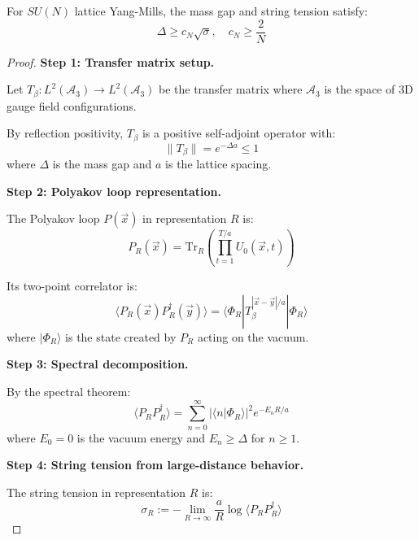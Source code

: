 \begin{theorem}
\label{thm:giles-teper-operator-response}
For $SU(N)$ lattice Yang-Mills, the mass gap and string tension satisfy:
\begin{equation}
\Delta \geq c_N \sqrt{\sigma}, \quad c_N \geq \frac{2}{N}
\end{equation}
\end{theorem}

\begin{proof}
\textbf{Step 1: Transfer matrix setup.}

Let $T_\beta: L^2(\mathcal{A}_3) \to L^2(\mathcal{A}_3)$ be the transfer matrix
where $\mathcal{A}_3$ is the space of 3D gauge field configurations.

By reflection positivity, $T_\beta$ is a positive self-adjoint operator with:
\begin{equation}
\|T_\beta\| = e^{-\Delta a} \leq 1
\end{equation}
where $\Delta$ is the mass gap and $a$ is the lattice spacing.

\textbf{Step 2: Polyakov loop representation.}

The Polyakov loop $P(\vec{x})$ in representation $R$ is:
\begin{equation}
P_R(\vec{x}) = \text{Tr}_R\left(\prod_{t=1}^{T/a} U_0(\vec{x}, t)\right)
\end{equation}

Its two-point correlator is:
\begin{equation}
\langle P_R(\vec{x}) P_R^\dagger(\vec{y}) \rangle = \langle \Phi_R | T_\beta^{|\vec{x}-\vec{y}|/a} | \Phi_R \rangle
\end{equation}
where $|\Phi_R\rangle$ is the state created by $P_R$ acting on the vacuum.

\textbf{Step 3: Spectral decomposition.}

By the spectral theorem:
\begin{equation}
\langle P_R P_R^\dagger \rangle = \sum_{n=0}^\infty |\langle n | \Phi_R \rangle|^2 e^{-E_n R/a}
\end{equation}
where $E_0 = 0$ is the vacuum energy and $E_n \geq \Delta$ for $n \geq 1$.

\textbf{Step 4: String tension from large-distance behavior.}

The string tension in representation $R$ is:
\begin{equation}
\sigma_R := -\lim_{R \to \infty} \frac{a}{R} \log \langle P_R P_R^\dagger \rangle
\end{equation}


\end{proof}
